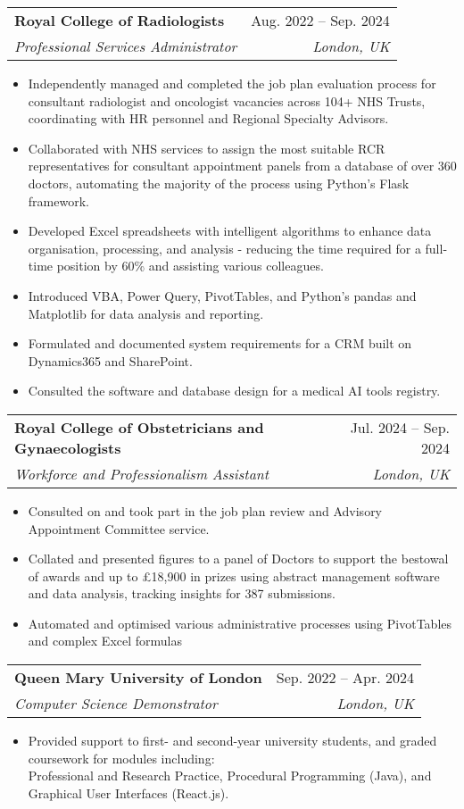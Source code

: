 \documentclass[letterpaper,10pt]{article}
\makeatletter
\newcommand{\resumeItem}[1]{
  \item\small{
    {#1 \vspace{-2pt}}
  }
}
\newcommand{\resumeSubheading}[4]{
  \vspace{-2pt}\item
    \begin{tabular*}{0.97\textwidth}[t]{l@{\extracolsep{\fill}}r}
      \textbf{#1} & #2 \\
      \textit{\small#3} & \textit{\small #4} \\
    \end{tabular*}\vspace{-7pt}
}
\newcommand{\resumeSubSubheading}[2]{
    \item
    \begin{tabular*}{0.97\textwidth}{l@{\extracolsep{\fill}}r}
      \textit{\small#1} & \textit{\small #2} \\
    \end{tabular*}\vspace{-7pt}
}
\newcommand{\resumeSubHeadingListEnd}{\end{itemize}}
\newcommand{\resumeItemListStart}{\begin{itemize}}
\newcommand{\resumeItemListEnd}{\end{itemize}\vspace{-5pt}}
\makeatother
\begin{document}
    \resumeSubheading
      {Royal College of Radiologists}{Aug. 2022 -- Sep. 2024}
      {Professional Services Administrator}{London, UK}
      \resumeItemListStart
      
\resumeItem{Independently managed and completed the job plan evaluation process for consultant radiologist and oncologist vacancies across 104+ NHS Trusts, coordinating with HR personnel and Regional Specialty Advisors.}
\resumeItem{Collaborated with NHS services to assign the most suitable RCR representatives for consultant appointment panels from a database of over 360 doctors, automating the majority of the process using Python’s Flask framework.}
\resumeItem{Developed Excel spreadsheets with intelligent algorithms to enhance data organisation, processing, and analysis - reducing the time required for a full-time position by 60\% and assisting various colleagues.}
\resumeItem{Introduced VBA, Power Query, PivotTables, and Python’s pandas and Matplotlib for data analysis and reporting.}
\resumeItem{Formulated and documented system requirements for a CRM built on Dynamics365 and SharePoint.}
\resumeItem{Consulted the software and database design for a medical AI tools registry.}
      \resumeItemListEnd
      

    \resumeSubheading
      {Royal College of Obstetricians and Gynaecologists}{Jul. 2024 -- Sep. 2024}
      {Workforce and Professionalism Assistant}{London, UK}
      \resumeItemListStart
\resumeItem{Consulted on and took part in the job plan review and Advisory Appointment Committee service.}
\resumeItem{Collated and presented figures to a panel of Doctors to support the bestowal of awards and up to £18,900 in prizes using abstract management software and data analysis, tracking insights for 387 submissions.}
\resumeItem{Automated and optimised various administrative processes using PivotTables and complex Excel formulas}
  \resumeItemListEnd
      

    \resumeSubheading
      {Queen Mary University of London}{Sep. 2022 -- Apr. 2024}
      {Computer Science Demonstrator}{London, UK}
      \resumeItemListStart
\resumeItem{Provided support to first- and second-year university students, and graded coursework for modules including: \\ Professional and Research Practice, Procedural Programming (Java), and Graphical User Interfaces (React.js).}
    \resumeItemListEnd
\end{document}
